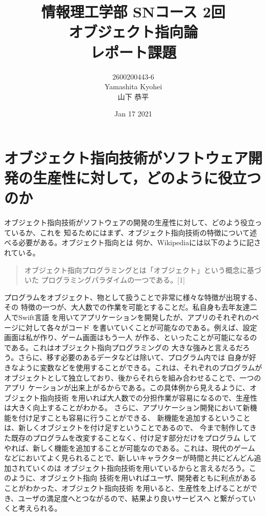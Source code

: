 \documentclass[dvipdfmx,autodetect-engine,titlepage]{jsarticle}
\title{情報理工学部 SNコース 2回\\
オブジェクト指向論\\
レポート課題}
\author{2600200443-6\\Yamashita Kyohei\\山下 恭平}
\date{Jan 17 2021}
\begin{document}
\maketitle

\section{オブジェクト指向技術がソフトウェア開発の生産性に対して，どのように役立つのか}
オブジェクト指向技術がソフトウェアの開発の生産性に対して、どのよう役立っているか、これを
知るためにはまず、オブジェクト指向技術の特徴について述べる必要がある。オブジェクト指向とは
何か、Wikipediaには以下のように記されている。
\begin{quote}
  オブジェクト指向プログラミングとは「オブジェクト」という概念に基づいた
  プログラミングパラダイムの一つである。[1]
\end{quote}
プログラムをオブジェクト、物として扱うことで非常に様々な特徴が出現する、その
特徴の一つが、大人数での作業を可能とすることだ。私自身も去年友達二人でSwift言語
を用いてアプリケーションを開発したが、アプリのそれぞれのページに対して各々がコード
を書いていくことが可能なのである。例えば、設定画面は私が作り、ゲーム画面はもう一人
が作る、といったことが可能になるのである。これはオブジェクト指向プログラミングの
大きな強みと言えるだろう。さらに、移す必要のあるデータなどは除いて、プログラム内では
自身が好きなように変数などを使用することができる。これは、それぞれのプログラムが
オブジェクトとして独立しており、後からそれらを組み合わせることで、一つのアプリ
ケーションが出来上がるからである。この具体例から見えるように、オブジェクト指向技術
を用いれば大人数での分担作業が容易になるので、生産性は大きく向上することがわかる。
さらに、アプリケーション開発において新機能を付け足すことも容易に行うことができる、
新機能を追加するということは、新しくオブジェクトを付け足すということであるので、
今まで制作してきた既存のプログラムを改変することなく、付け足す部分だけをプログラム
してやれば、新しく機能を追加することが可能なのである。これは、現代のゲーム
などにおいてよく見られることで、新しいキャラクターが時間と共にどんどん追加されていくのは
オブジェクト指向技術を用いているからと言えるだろう。このように、オブジェクト指向
技術を用いればユーザ、開発者ともに利点があることがわかった、オブジェクト指向技術
を用いると、生産性を上げることができ、ユーザの満足度へとつながるので、結果より良いサービスへ
と繋がっていくと考えられる。
\end{document}
